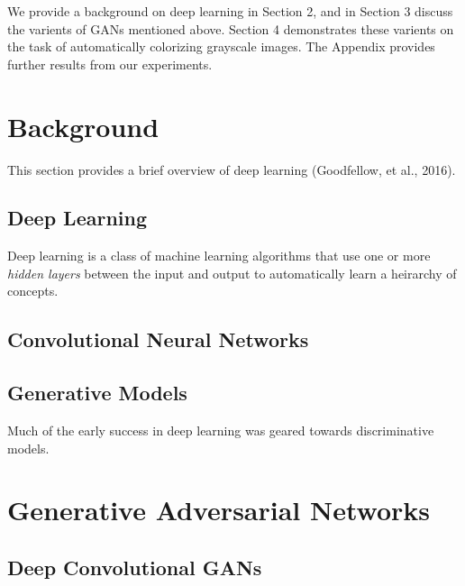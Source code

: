 \documentclass{article}
\begin{document}
\noindent We provide a background on deep learning in Section 2, and in Section 3 discuss the varients of GANs mentioned above.
Section 4 demonstrates these varients on the task of automatically colorizing grayscale images. The Appendix provides further
results from our experiments.

\section{Background}
This section provides a brief overview of deep learning (Goodfellow, et al., 2016).

\subsection{Deep Learning}
Deep learning is a class of machine learning algorithms that use one or more \textit{hidden layers} between the input and output
to automatically learn a heirarchy of concepts.

\subsection{Convolutional Neural Networks}


\subsection{Generative Models}
Much of the early success in deep learning was geared towards discriminative models.



\section{Generative Adversarial Networks}


\subsection{Deep Convolutional GANs}
\end{document}
